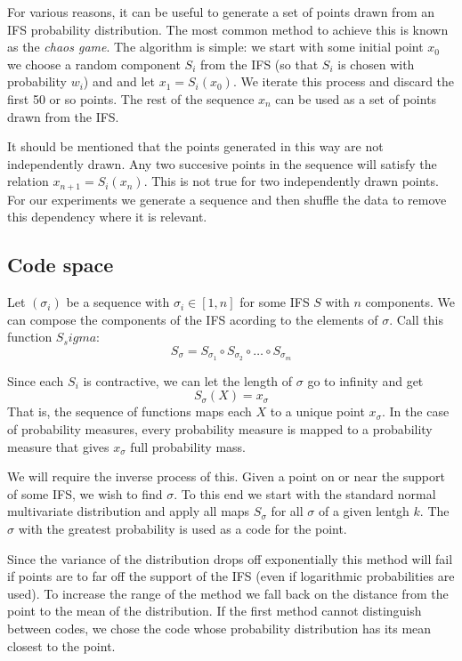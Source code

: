 \documentclass[11pt, twocolumn]{article}
\theoremstyle{definition}
\begin{document}
For various reasons, it can be useful to generate a set of points drawn from an IFS probability distribution. The most common method to achieve this is known as the \emph{chaos game}. The algorithm is simple: we start with some initial point $x_0$ we choose a random component $S_i$ from the IFS (so that $S_i$ is chosen with probability $w_i$) and and let $x_1 = S_i(x_0)$. We iterate this process and discard the first 50 or so points. The rest of the sequence $x_n$ can be used as a set of points drawn from the IFS.

It should be mentioned that the points generated in this way are not independently drawn. Any two succesive points in the sequence will satisfy the relation $x_{n+1} = S_i(x_{n})$. This is not true for two independently drawn points. For our experiments we generate a sequence and then shuffle the data to remove this dependency where it is relevant.

\subsection{Code space}

Let $(\sigma_i)$ be a sequence with $\sigma_i \in [1, n]$ for some IFS $S$ with $n$ components. We can compose the components of the IFS acording to the elements of $\sigma$. Call this function $S_sigma$:
\[
S_\sigma = S_{\sigma_1} \circ S_{\sigma_2} \circ \ldots \circ S_{\sigma_m}
\]

Since each $S_i$ is contractive, we can let the length of $\sigma$ go to infinity and get 
\[
S_\sigma(X) = x_\sigma  
\] 
That is, the sequence of functions maps each $X$ to a unique point $x_\sigma$. In the case of probability measures, every probability measure is mapped to a probability measure that gives $x_\sigma$ full probability mass.

We will require the inverse process of this. Given a point on or near the support of some IFS, we wish to find $\sigma$. To this end we start with the standard normal multivariate distribution and apply all maps $S_\sigma$ for all $\sigma$ of a given lentgh $k$. The $\sigma$ with the greatest probability is used as a code for the point.

Since the variance of the distribution drops off exponentially this method will fail if points are to far off the support of the IFS (even if logarithmic probabilities are used). To increase the range of the method we fall back on the distance from the point to the mean of the distribution. If the first method cannot distinguish between codes, we chose the code whose probability distribution has its mean closest to the point.
\end{document}
